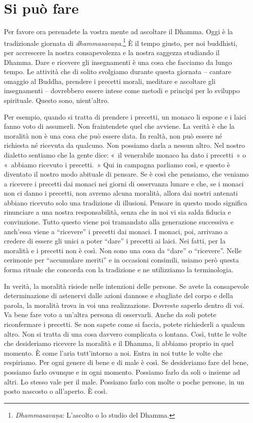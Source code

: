 \chapter{Si può fare}

Per favore ora persuadete la vostra mente ad ascoltare il Dhamma. Oggi è
la tradizionale giornata di \emph{dhammasavaṇa}.\footnote{\emph{Dhammasavaṇa}:
  L'ascolto o lo studio del Dhamma.} È il tempo giusto, per noi
buddhisti, per accrescere la nostra consapevolezza e la nostra saggezza
studiando il Dhamma. Dare e ricevere gli insegnamenti è una cosa che
facciamo da lungo tempo. Le attività che di solito svolgiamo durante
questa giornata -- cantare omaggio al Buddha, prendere i precetti
morali, meditare e ascoltare gli insegnamenti -- dovrebbero essere
intese come metodi e principi per lo sviluppo spirituale. Questo sono,
nient'altro.

Per esempio, quando si tratta di prendere i precetti, un monaco li
espone e i laici fanno voto di assumerli. Non fraintendete quel che
avviene. La verità è che la moralità non è una cosa che può essere data.
In realtà, non può essere né richiesta né ricevuta da qualcuno. Non
possiamo darla a nessun altro. Nel nostro dialetto sentiamo che la gente
dice: «~il venerabile monaco ha dato i precetti~» o «~abbiamo ricevuto i
precetti.~» Qui in campagna parliamo così, e questo è diventato il
nostro modo abituale di pensare. Se è così che pensiamo, che veniamo a
ricevere i precetti dai monaci nei giorni di osservanza lunare e che, se
i monaci non ci danno i precetti, non avremo alcuna moralità, allora dai
nostri antenati abbiano ricevuto solo una tradizione di illusioni.
Pensare in questo modo significa rinunciare a una nostra responsabilità,
senza che in noi vi sia salda fiducia e convinzione. Tutto questo viene
poi tramandato alla generazione successiva e anch'essa viene a
``ricevere'' i precetti dai monaci. I monaci, poi, arrivano a credere di
essere gli unici a poter ``dare'' i precetti ai laici. Nei fatti, per la
moralità e i precetti non è così. Non sono una cosa da ``dare'' o
``ricevere''. Nelle cerimonie per ``accumulare meriti'' e in occasioni
consimili, usiamo però questa forma rituale che concorda con la
tradizione e ne utilizziamo la terminologia.

In verità, la moralità risiede nelle intenzioni delle persone. Se avete
la consapevole determinazione di astenervi dalle azioni dannose e
sbagliate del corpo e della parola, la moralità trova in voi una
realizzazione. Dovreste saperlo dentro di voi. Va bene fare voto a
un'altra persona di osservarli. Anche da soli potete riconfermare i
precetti. Se non sapete come si faccia, potete richiederli a qualcun
altro. Non si tratta di una cosa davvero complicata o lontana. Così,
tutte le volte che desideriamo ricevere la moralità e il Dhamma, li
abbiamo proprio in quel momento. È come l'aria tutt'intorno a noi. Entra
in noi tutte le volte che respiriamo. Per ogni genere di bene e di male
è così. Se desideriamo fare del bene, possiamo farlo ovunque e in ogni
momento. Possiamo farlo da soli o insieme ad altri. Lo stesso vale per
il male. Possiamo farlo con molte o poche persone, in un posto nascosto
o all'aperto. È così.

